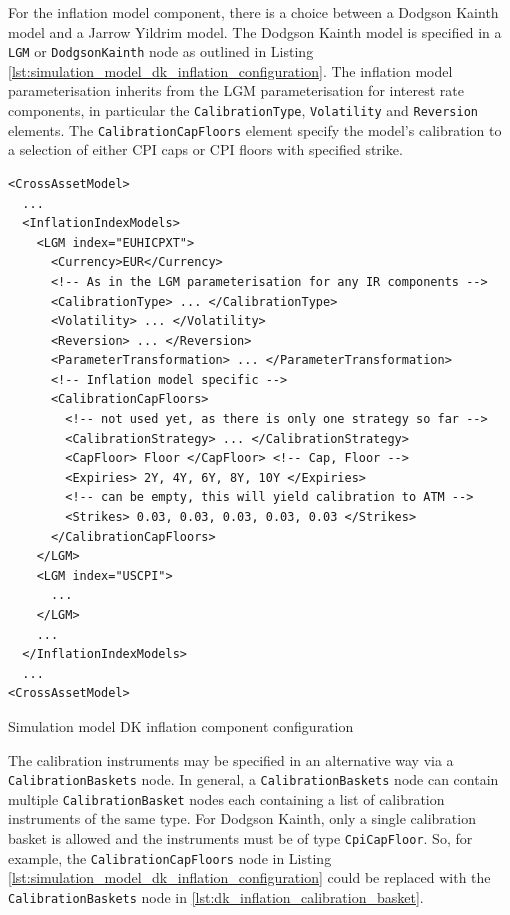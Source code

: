 \documentclass[12pt, a4paper]{article}
\begin{document}
{{\medskip

For the inflation model component, there is a choice between a Dodgson Kainth model and a Jarrow Yildrim model. The Dodgson Kainth 
model is specified in a \lstinline!LGM! or \lstinline!DodgsonKainth! node as outlined in Listing \ref{lst:simulation_model_dk_inflation_configuration}.
The inflation model parameterisation inherits from the LGM parameterisation for interest rate components, in particular the \lstinline!CalibrationType!, 
\lstinline!Volatility! and \lstinline!Reversion! elements. The \lstinline!CalibrationCapFloors! element specify the model's calibration to a selection of 
either CPI caps or CPI floors with specified strike.

\begin{listing}[H]
\begin{verbatim}
<CrossAssetModel>	
  ...
  <InflationIndexModels>
    <LGM index="EUHICPXT">
      <Currency>EUR</Currency>
      <!-- As in the LGM parameterisation for any IR components -->
      <CalibrationType> ... </CalibrationType>
      <Volatility> ... </Volatility>
      <Reversion> ... </Reversion> 
      <ParameterTransformation> ... </ParameterTransformation>
      <!-- Inflation model specific -->
      <CalibrationCapFloors>
        <!-- not used yet, as there is only one strategy so far -->
        <CalibrationStrategy> ... </CalibrationStrategy> 
        <CapFloor> Floor </CapFloor> <!-- Cap, Floor -->
        <Expiries> 2Y, 4Y, 6Y, 8Y, 10Y </Expiries>
        <!-- can be empty, this will yield calibration to ATM -->
        <Strikes> 0.03, 0.03, 0.03, 0.03, 0.03 </Strikes> 
      </CalibrationCapFloors>
    </LGM>
    <LGM index="USCPI">
      ...
    </LGM>
    ...
  </InflationIndexModels>
  ...
<CrossAssetModel>	
\end{verbatim}
\caption{Simulation model DK inflation component configuration}
\label{lst:simulation_model_dk_inflation_configuration}
\end{listing}

The calibration instruments may be specified in an alternative way via a \lstinline!CalibrationBaskets! node. In general, a \lstinline!CalibrationBaskets! node 
can contain multiple \lstinline!CalibrationBasket! nodes each containing a list of calibration instruments of the same type. For Dodgson Kainth, only a single 
calibration basket is allowed and the instruments must be of type \lstinline!CpiCapFloor!. So, for example, the \lstinline!CalibrationCapFloors! node in 
Listing \ref{lst:simulation_model_dk_inflation_configuration} could be replaced with the \lstinline!CalibrationBaskets! node in \ref{lst:dk_inflation_calibration_basket}.

}}
\end{document}

